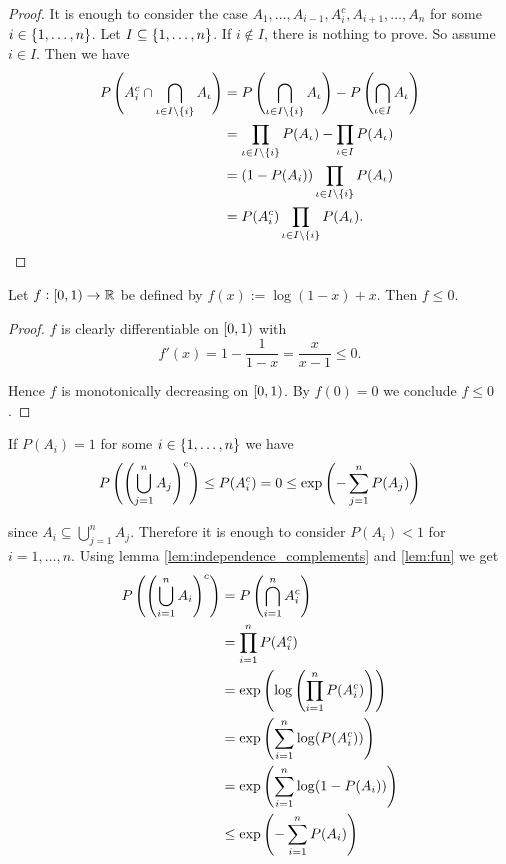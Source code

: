 \begin{enumerate}[label = \textbf{Exercise \arabic*.},wide = 0pt, itemsep=1.5ex]
\begin{enumerate}[label = \arabic*.,wide = 0pt, itemsep=1.5ex]
				\begin{proof}
					It is enough to consider the case $A_1,\dots,A_{i - 1},A_i^c,A_{i + 1},\dots,A_n$ for some $i \in \cbr[0]{1,\dots,n}$. Let $I \subseteq \cbr[0]{1,\dots,n}$. If $i \notin I$, there is nothing to prove. So assume $i \in I$. Then we have
					\begin{align*}
						P\del[4]{A_i^c \cap \bigcap_{\iota \in I \setminus \cbr[0]{i}} A_\iota} &= P\del[4]{\bigcap_{\iota \in I \setminus \cbr[0]{i}}A_\iota}- P\del[4]{\bigcap_{\iota \in I} A_\iota}\\
						&= \prod_{\iota \in I \setminus \cbr[0]{i}} P(A_\iota) - \prod_{\iota \in I} P(A_\iota)\\
						&= (1 - P(A_i))\prod_{\iota \in I \setminus \cbr[0]{i}} P(A_\iota)\\
						&= P(A_i^c) \prod_{\iota \in I \setminus \cbr[0]{i}} P(A_\iota).
					\end{align*}
				\end{proof}

				\begin{lemma}
					Let $f: \intco{0,1} \to \mathbb{R}$ be defined by $f(x) := \log(1-x)+x$. Then $f \leq 0$.
					\label{lem:fun}
				\end{lemma}

				\begin{proof}
					$f$ is clearly differentiable on $\intco{0,1}$ with
					\begin{equation}
						f'(x) = 1 - \frac{1}{1 - x} = \frac{x}{x - 1} \leq 0.
					\end{equation}

					Hence $f$ is monotonically decreasing on $\intco{0,1}$. By $f(0) = 0$ we conclude $f \leq 0$.
				\end{proof}
				If $P(A_i) = 1$ for some $i \in \cbr[0]{1,\dots,n}$ we have
				\begin{equation*}
					P\del[4]{\del[4]{\bigcup_{j = 1}^n A_j}^c} \leq P(A_i^c) = 0 \leq \exp\del[4]{-\sum_{j = 1}^n P(A_j)}
				\end{equation*}

				\noindent since $A_i \subseteq \bigcup_{j = 1}^n A_j$. Therefore it is enough to consider $P(A_i) < 1$ for $i = 1,\dots,n$. Using lemma \ref{lem:independence_complements} and \ref{lem:fun} we get
				\begin{align*}
					P\del[4]{\del[4]{\bigcup_{i = 1}^n A_i}^c} &= P\del[4]{\bigcap_{i = 1}^n A_i^c}\\
					&= \prod_{i = 1}^n P(A_i^c)\\
					&= \exp \del[4]{\log \del[4]{\prod_{i = 1}^n P(A_i^c)}}\\
					&= \exp \del[4]{\sum_{i = 1}^n \log(P(A_i^c))}\\
					&= \exp \del[4]{\sum_{i = 1}^n \log(1 - P(A_i))}\\
					&\leq \exp \del[4]{-\sum_{i = 1}^n P(A_i)}
				\end{align*}
		\end{enumerate}
\end{enumerate}
\printbibliography

